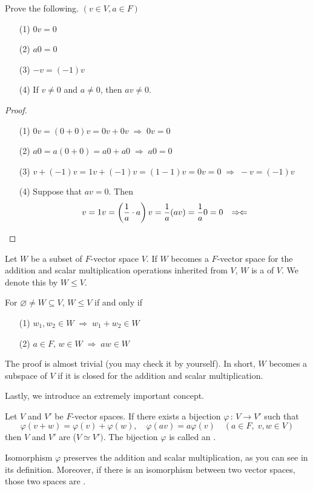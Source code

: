 \documentclass[a4paper, 10pt]{article}
\begin{document}
\begin{exer}
    Prove the following. $(v \in V, a \in F)$
    \begin{itemize}
        \item[(1)] $0v = 0$
        \item[(2)] $a0 = 0$
        \item[(3)] $-v = (-1)v$
        \item[(4)] If $v \neq 0$ and $a \neq 0$, then $av \neq 0$.
    \end{itemize}
\end{exer}
\begin{proof}
    \begin{itemize}
        \item[(1)] $0v = (0 + 0)v = 0v + 0v \;\Longrightarrow\; 0v = 0$
        \item[(2)] $a0 = a(0 + 0) = a0 + a0 \;\Longrightarrow\; a0 = 0$
        \item[(3)] $v + (-1)v = 1v + (-1)v = (1 - 1)v = 0v = 0 \;\Longrightarrow\; -v = (-1)v$
        \item[(4)] Suppose that $av = 0$. Then
        \[ v = 1v = \left(\frac{1}{a} \cdot a\right)v = \frac{1}{a}(av) = \frac{1}{a}0 = 0 \quad {\Rightarrow\mspace{-2mu}\Leftarrow} \]
    \end{itemize}
\end{proof}
\begin{definition}[Subspaces]
    Let $W$ be a subset of $F$-vector space $V$. If $W$ becomes a $F$-vector space for the addition and scalar multiplication operations inherited from $V$, $W$ is a  of $V$. We denote this by $W \leq V$.
\end{definition}
\begin{obs}
    For $\varnothing \neq W \subseteq V$, $W \leq V$ if and only if
    \begin{itemize}
        \item[(1)] $w_{1}, w_{2} \in W \;\Longrightarrow\; w_{1} + w_{2} \in W$
        \item[(2)] $a \in F, \, w \in W \;\Longrightarrow\; aw \in W$
    \end{itemize}
\end{obs}
The proof is almost trivial (you may check it by yourself). In short, $W$ becomes a subspace of $V$ if it is closed for the addition and scalar multiplication.

\seprule

Lastly, we introduce an extremely important concept.
\begin{definition}[Isomorphisms]
    Let $V$ and $V'$ be $F$-vector spaces. If there exists a bijection $\varphi \,:\, V \rightarrow V'$ such that
    \[ \varphi(v + w) = \varphi(v) + \varphi(w), \quad \varphi(av) = a\varphi(v) \quad (a \in F, \; v, w \in V) \]
    then $V$ and $V'$ are  ($V \simeq V')$. The bijection $\varphi$ is called an .
\end{definition}
\begin{remark}
    Isomorphism $\varphi$ preserves the addition and scalar multiplication, as you can see in its definition. Moreover, if there is an isomorphism between two vector spaces, those two spaces are  .
\end{remark}
\newpage
\end{document}
